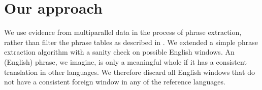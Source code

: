 \documentclass[11pt]{article}
\begin{document}

\section{Our approach}
We use evidence from multiparallel data in the process of phrase extraction, rather than filter the phrase tables as described in \cite{chen}. We extended a simple phrase extraction algorithm with a sanity check on possible English windows. An (English) phrase, we imagine, is only a meaningful whole if it has a consistent translation in other languages. We therefore discard all English windows that do not have a consistent foreign window in any of the reference languages.
\end{document}
